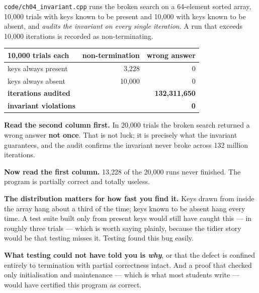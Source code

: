 \begin{worked}
\texttt{code/ch04\_invariant.cpp} runs the broken search on a 64-element sorted
array, 10{,}000 trials with keys known to be present and 10{,}000 with keys
known to be absent, and \emph{audits the invariant on every single iteration}.
A run that exceeds 10{,}000 iterations is recorded as non-terminating.

\begin{center}
\begin{tabular}{@{}lrr@{}}
\toprule
\rowcolor{primary!15}
10{,}000 trials each & non-termination & wrong answer \\
\midrule
keys always present & 3{,}228 & 0 \\
keys always absent  & 10{,}000 & 0 \\
\midrule
\textbf{iterations audited} & \multicolumn{2}{r}{\textbf{132{,}311{,}650}} \\
\textbf{invariant violations} & \multicolumn{2}{r}{\textbf{0}} \\
\bottomrule
\end{tabular}
\end{center}

\smallskip
\textbf{Read the second column first.} In 20{,}000 trials the broken search
returned a wrong answer \textbf{not once}. That is not luck; it is precisely
what the invariant guarantees, and the audit confirms the invariant never
broke across 132 million iterations.

\smallskip
\textbf{Now read the first column.} 13{,}228 of the 20{,}000 runs never
finished. The program is partially correct and totally useless.

\smallskip
\textbf{The distribution matters for how fast you find it.} Keys drawn from
inside the array hang about a third of the time; keys known to be absent hang
every time. A test suite built only from present keys would still have caught
this --- in roughly three trials --- which is worth saying plainly, because the
tidier story would be that testing misses it. Testing found this bug easily.

\smallskip
\textbf{What testing could not have told you is \emph{why}}, or that the
defect is confined entirely to termination with partial correctness intact. And
a proof that checked only initialisation and maintenance --- which is what most
students write --- would have certified this program as correct.
\end{worked}

